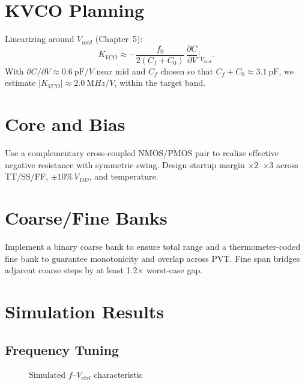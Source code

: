 \section{KVCO Planning}
Linearizing around $V_{mid}$ (Chapter~5):
\[
 K_{VCO} \approx -\frac{f_0}{2(C_f+C_0)}\,\frac{\partial C}{\partial V}\Big|_{V_{mid}}.
\]
With $\partial C/\partial V \approx \SI{0.6}{\pF/V}$ near mid and $C_f$ chosen so that $C_f+C_0\approx \SI{3.1}{\pF}$, we estimate $|K_{VCO}|\approx \SI{2.0}{\mega Hz/V}$, within the target band.

\section{Core and Bias}
Use a complementary cross-coupled NMOS/PMOS pair to realize effective negative resistance with symmetric swing. Design startup margin $\times 2$--$\times 3$ across TT/SS/FF, $\pm10\%\,V_{DD}$, and temperature.

\section{Coarse/Fine Banks}
Implement a binary coarse bank to ensure total range and a thermometer-coded fine bank to guarantee monotonicity and overlap across PVT. Fine span bridges adjacent coarse steps by at least 1.2$\times$ worst-case gap.

\section{Simulation Results}
\subsection*{Frequency Tuning}
\begin{figure}[H]
  \centering
  \caption{Simulated $f$--$V_{ctrl}$ characteristic}
\end{figure}

